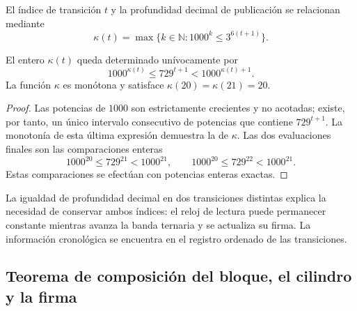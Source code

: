 \begin{definition}
El índice de transición \(t\) y la profundidad decimal de publicación se
relacionan mediante
\begin{equation}
 \kappa(t)=\max\{k\in\mathbb N:1000^k\leq3^{6(t+1)}\}.
 \label{eq:df-reloj}
\end{equation}
\end{definition}

\begin{proposition}
\label{prop:df-reloj}
El entero \(\kappa(t)\) queda determinado unívocamente por
\begin{equation}
 1000^{\kappa(t)}\leq729^{t+1}<1000^{\kappa(t)+1}.
 \label{eq:df-reloj-cotas}
\end{equation}
La función \(\kappa\) es monótona y satisface
\(\kappa(20)=\kappa(21)=20\).
\end{proposition}

\begin{proof}
Las potencias de \(1000\) son estrictamente crecientes y no acotadas;
existe, por tanto, un único intervalo consecutivo de potencias que
contiene \(729^{t+1}\). La monotonía de esta última expresión demuestra
la de \(\kappa\). Las dos evaluaciones finales son las comparaciones
enteras
\[
 1000^{20}\leq729^{21}<1000^{21},\qquad
 1000^{20}\leq729^{22}<1000^{21}.
\]
Estas comparaciones se efectúan con potencias enteras exactas.
\end{proof}

La igualdad de profundidad decimal en dos transiciones distintas explica
la necesidad de conservar ambos índices: el reloj de lectura puede
permanecer constante mientras avanza la banda ternaria y se actualiza su
firma. La información cronológica se encuentra en el registro ordenado
de las transiciones.

\subsection{Teorema de composición del bloque, el cilindro y la firma}

